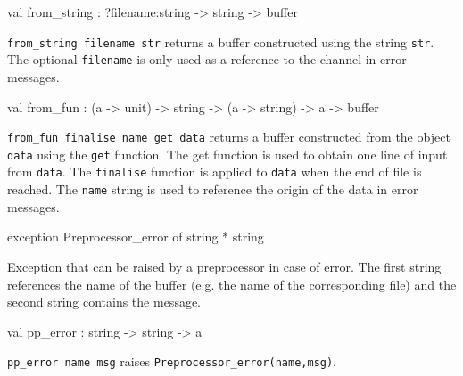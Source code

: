 \documentclass[11pt]{article}
\begin{document}
\label{val:Input.from-underscorestring}\begin{ocamldoccode}
val from_string : ?filename:string -> string -> buffer
\end{ocamldoccode}
\begin{ocamldocdescription}
{\tt{from\_string {}filename str}} returns a buffer constructed  using  the
    string {\tt{str}}. The optional {\tt{filename}} is only used as a reference to
    the channel in error messages.


\end{ocamldocdescription}




\label{val:Input.from-underscorefun}\begin{ocamldoccode}
val from_fun : ({\textquotesingle}a -> unit) -> string -> ({\textquotesingle}a -> string) -> {\textquotesingle}a -> buffer
\end{ocamldoccode}
\begin{ocamldocdescription}
{\tt{from\_fun finalise name get data}} returns a buffer constructed  from
    the object {\tt{data}} using the {\tt{get}} function. The get function is used
    to obtain one line of input from {\tt{data}}. The {\tt{finalise}} function  is
    applied to {\tt{data}} when the end of file is reached. The {\tt{name}} string
    is used to reference the origin of the data in error messages.


\end{ocamldocdescription}




\label{exception:Input.Preprocessor-underscoreerror}\begin{ocamldoccode}
exception Preprocessor_error of string * string
\end{ocamldoccode}
\begin{ocamldocdescription}
Exception that can be raised by a preprocessor in case of error. The
    first string references the name of the buffer (e.g. the name of the
    corresponding file) and the second string contains the message.


\end{ocamldocdescription}




\label{val:Input.pp-underscoreerror}\begin{ocamldoccode}
val pp_error : string -> string -> {\textquotesingle}a
\end{ocamldoccode}
\begin{ocamldocdescription}
{\tt{pp\_error name msg}} raises {\tt{Preprocessor\_error(name,msg)}}.


\end{ocamldocdescription}
\end{document}
